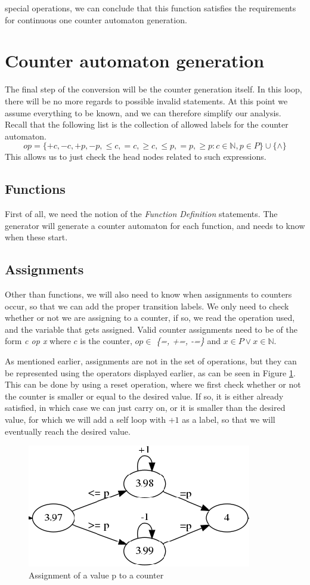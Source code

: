 \documentclass[12pt]{thesis}
\begin{document}
\noindent
special operations, we can conclude that this function satisfies the requirements for continuous one counter automaton generation.

\section{Counter automaton generation}
\label{sec:generation}
The final step of the conversion will be the counter generation itself. In this loop, there will be no more regards to possible invalid statements. At this point we assume everything to be known, and we can therefore simplify our analysis. Recall that the following list is the collection of allowed labels for the counter automaton.
\[
op = \{+c, -c, +p, -p, \leq c, =c, \geq c, \leq p, =p, \geq p: c \in \mathbb{N}, p \in P\} \cup \{\wedge\}
\]
This allows us to just check the head nodes related to such expressions.

\subsection{Functions}
First of all, we need the notion of the \textit{Function Definition} statements. The generator will generate a counter automaton for each function, and needs to know when these start.

\subsection{Assignments}
Other than functions, we will also need to know when assignments to counters occur, so that we can add the proper transition labels. We only need to check whether or not we are assigning to a counter, if so, we read the operation used, and the variable that gets assigned. Valid counter assignments need to be of the form \textit{c op x} where $c$ is the counter, $op \in $ \textit{\{=, +=, -=\}} and $x \in P \lor x \in \mathbb{N}$. 

As mentioned earlier, assignments are not in the set of operations, but they can be represented using the operators displayed earlier, as can be seen in Figure \ref{fig:counter_assignment}. This can be done by using a reset operation, where we first check whether or not the counter is smaller or equal to the desired value. If so, it is either already satisfied, in which case we can just carry on, or it is smaller than the desired value, for which we will add a self loop with $+1$ as a label, so that we will eventually reach the desired value. 
\begin{figure}[h]
	\centering
	\includegraphics[width=0.48\linewidth]{counter_assignment}
	\caption{Assignment of a value p to a counter}
	\label{fig:counter_assignment}
\end{figure}
\end{document}
